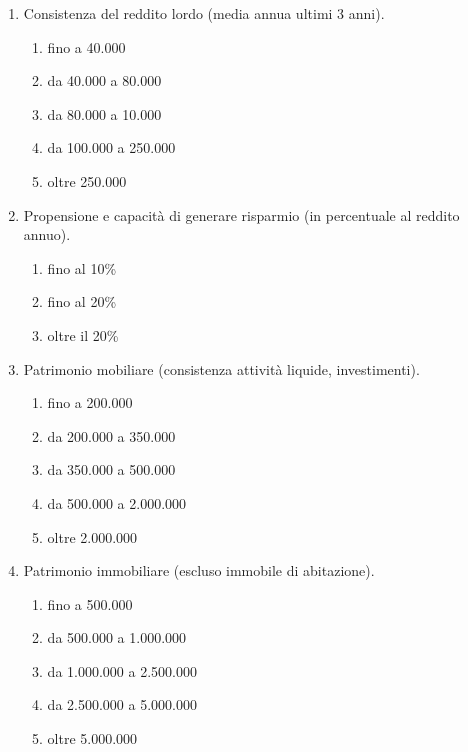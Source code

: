\begin{itemize}
\begin{enumerate}
        \begin{enumerate}[label*=\arabic*]
            \item Consistenza del reddito lordo (media annua ultimi 3 anni).
            \begin{enumerate}
                \item fino a 40.000
                \item da 40.000 a 80.000
                \item da 80.000 a 10.000
                \item da 100.000 a 250.000
                \item oltre 250.000 
            \end{enumerate}

            \item Propensione e capacità di generare risparmio (in percentuale al reddito annuo).
            \begin{enumerate}
                \item fino al 10\%
                \item fino al 20\%
                \item oltre il 20\%
            \end{enumerate}

            \item Patrimonio mobiliare (consistenza attività liquide, investimenti).
            \begin{enumerate}
                \item fino a 200.000
                \item da 200.000 a 350.000
                \item da 350.000 a 500.000
                \item da 500.000 a 2.000.000
                \item oltre 2.000.000 
            \end{enumerate}

            \item Patrimonio immobiliare (escluso immobile di abitazione).
            \begin{enumerate}
                \item fino a 500.000
                \item da 500.000 a 1.000.000
                \item da 1.000.000 a 2.500.000
                \item da 2.500.000 a 5.000.000
                \item oltre 5.000.000
            \end{enumerate}


\end{enumerate}
\end{enumerate}
\end{itemize}
